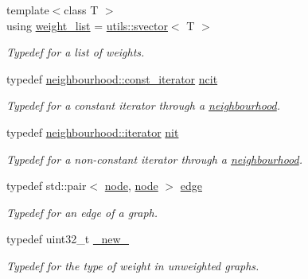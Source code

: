 \begin{DoxyCompactItemize}
\mbox{\label{namespacelgraph_a1e0fd5ef0a78b2a92da48adbed265cb6}} 
{\footnotesize template$<$class T $>$ }\\using \hyperlink{namespacelgraph_a1e0fd5ef0a78b2a92da48adbed265cb6}{weight\+\_\+list} = \hyperlink{classlgraph_1_1utils_1_1svector}{utils\+::svector}$<$ T $>$
\begin{DoxyCompactList}\small\item\em Typedef for a list of weights. \end{DoxyCompactList}\item 
\mbox{\label{namespacelgraph_a9db6fe3bec7403f09c603c229beb7e40}} 
typedef \hyperlink{classlgraph_1_1utils_1_1svector_a50774ce617a742e76f3fb8cc0a7a9445}{neighbourhood\+::const\+\_\+iterator} \hyperlink{namespacelgraph_a9db6fe3bec7403f09c603c229beb7e40}{ncit}
\begin{DoxyCompactList}\small\item\em Typedef for a constant iterator through a \hyperlink{namespacelgraph_a052e7766c13f3a43cec0aec8173fdede}{neighbourhood}. \end{DoxyCompactList}\item 
\mbox{\label{namespacelgraph_ad402f72c6d926f6e75ba3523515e0e4a}} 
typedef \hyperlink{classlgraph_1_1utils_1_1svector_a518288794e754e27d2e2274ced4485a6}{neighbourhood\+::iterator} \hyperlink{namespacelgraph_ad402f72c6d926f6e75ba3523515e0e4a}{nit}
\begin{DoxyCompactList}\small\item\em Typedef for a non-\/constant iterator through a \hyperlink{namespacelgraph_a052e7766c13f3a43cec0aec8173fdede}{neighbourhood}. \end{DoxyCompactList}\item 
\mbox{\label{namespacelgraph_a76bd7d50719f03de7a85db259d80d572}} 
typedef std\+::pair$<$ \hyperlink{namespacelgraph_a397169dd66adf725210a30fb7251773e}{node}, \hyperlink{namespacelgraph_a397169dd66adf725210a30fb7251773e}{node} $>$ \hyperlink{namespacelgraph_a76bd7d50719f03de7a85db259d80d572}{edge}
\begin{DoxyCompactList}\small\item\em Typedef for an edge of a graph. \end{DoxyCompactList}\item 
typedef uint32\+\_\+t \hyperlink{namespacelgraph_a2836f966c1c36b43da337d8907728ec0}{\+\_\+new\+\_\+}
\begin{DoxyCompactList}\small\item\em Typedef for the type of weight in unweighted graphs. \end{DoxyCompactList}\end{DoxyCompactItemize}
